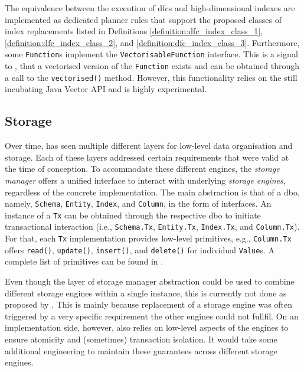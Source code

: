 The equivalence between the execution of \acrshort{dfc}s and high-dimensional indexes are implemented as dedicated planner rules that support the proposed classes of index replacements listed in Definitions \ref{definition:dfc_index_class_1}, \ref{definition:dfc_index_class_2}, and \ref{definition:dfc_index_class_3}. Furthermore, some \texttt{Function}s implement the \texttt{VectorisableFunction} interface. This is a signal to \cottontail{}, that a vectorised version of the \texttt{Function} exists and can be obtained through a call to the \texttt{vectorised()} method. However, this functionality relies on the still incubating Java Vector API and is highly experimental.

\subsection{Storage}
Over time, \cottontail{} has seen multiple different layers for low-level data organisation and storage. Each of these layers addressed certain requirements that were valid at the time of conception. To accommodate these different engines, the \emph{storage manager} offers a unified interface to interact with underlying \emph{storage engines}, regardless of the concrete implementation. The main abstraction is that of a \acrfull{dbo}, namely, \texttt{Schema}, \texttt{Entity}, \texttt{Index}, and \texttt{Column}, in the form of interfaces. An instance of a \texttt{Tx} can be obtained through the respective \acrshort{dbo} to initiate transactional interaction (i.e., \texttt{Schema.Tx}, \texttt{Entity.Tx}, \texttt{Index.Tx}, and \texttt{Column.Tx}). For that, each \texttt{Tx} implementation provides low-level primitives, e.g., \texttt{Column.Tx} offers \texttt{read()}, \texttt{update()}, \texttt{insert()}, and \texttt{delete()} for individual \texttt{Value}s. A complete list of primitives can be found in .

Even though the layer of storage manager abstraction could be used to combine different storage engines within a single instance, this is currently not done as proposed by \cite{Giangreco:2018Database}. This is mainly because replacement of a storage engine was often triggered by a very specific requirement the other engines could not fullfil. On an implementation side, however, \cottontail{} also relies on low-level aspects of the engines to ensure atomicity and (sometimes) transaction isolation. It would take some additional engineering to maintain these guarantees across different storage engines.

